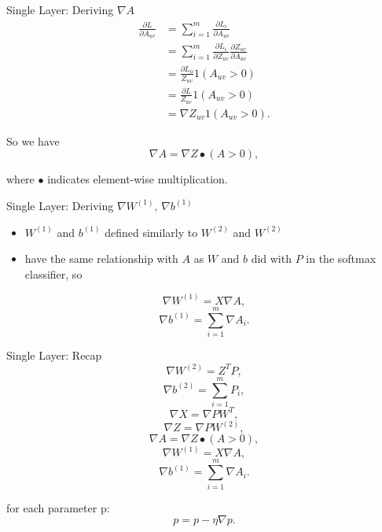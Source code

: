\documentclass{beamer}
\begin{document}
  \begin{frame}{Single Layer: Deriving $\nabla A$}
    \begin{align*}
      \frac{\partial L}{\partial A_{uv}}
      &= \sum_{i=1}^m \frac{\partial L_i}{\partial A_{uv}}\\
      &= \sum_{i=1}^m \frac{\partial L_i}{\partial Z_{uv}} \frac{\partial
         Z_{uv}}{\partial A_{uv}}\\
      &= \frac{\partial L_u}{Z_{uv}} 1(A_{uv} > 0)\\
      &= \frac{\partial L}{Z_{uv}} 1(A_{uv} > 0)\\
      &= \nabla Z_{uv} 1(A_{uv} > 0).
    \end{align*}

    So we have
    $$ \nabla A = \nabla Z \bullet (A > 0), $$

    where $\bullet$ indicates element-wise multiplication.
  \end{frame}

  \begin{frame}{Single Layer: Deriving $\nabla W^{(1)}$, $\nabla b^{(1)}$}
    \begin{itemize}
    \item $W^{(1)}$ and $b^{(1)}$ defined similarly to $W^{(2)}$ and $W^{(2)}$
    \item have the same relationship with $A$ as $W$ and $b$ did with $P$ in
    the softmax classifier, so
    \end{itemize}
    $$ \nabla W^{(1)} = X \nabla A, $$
    $$ \nabla b^{(1)} = \sum_{i=1}^m \nabla A_i.$$

  \end{frame}

  \begin{frame}{Single Layer: Recap}
    $$ \nabla W^{(2)} = Z^T P, $$
    $$ \nabla b^{(2)} = \sum_{i=1}^m P_i, $$
    $$ \nabla X       = \nabla PW^T, $$
    $$ \nabla Z       = \nabla PW^{(2)}, $$
    $$ \nabla A       = \nabla Z \bullet (A > 0), $$
    $$ \nabla W^{(1)} = X \nabla A, $$
    $$ \nabla b^{(1)} = \sum_{i=1}^m \nabla A_i. $$
    
    for each parameter p:
      $$ p = p - \eta \nabla p. $$
  \end{frame}
\end{document}
